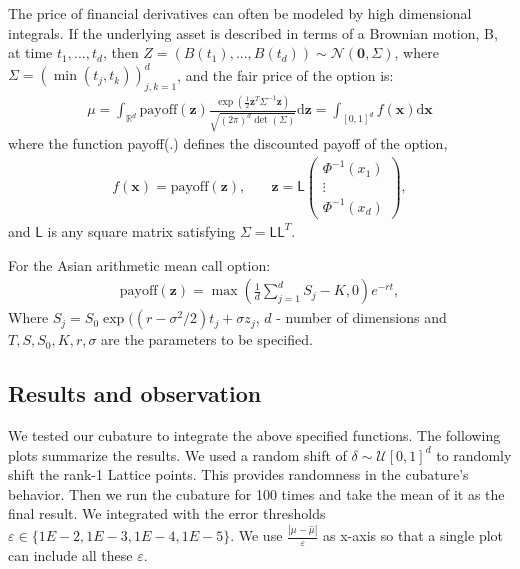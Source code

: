 \documentclass[twocolumn]{svjour3}          %
\newcommand{\bm}[1]{\boldsymbol{#1}}
\newcommand{\mSigma}{\Sigma}
\newcommand{\dif}[1]{\text{d}{#1}}
\newcommand{\reals}{\mathbb{R}}
\newcommand{\vx}{\bm{x}}
\newcommand{\dvx}{\dif{\bm{x}}}
\newcommand{\vz}{\bm{z}}
\newcommand{\dvz}{\dif{\bm{z}}}
\newcommand{\vzero}{\bm{0}}
\newcommand{\mL}{\mathsf{L}}
\newcommand{\calN}{\mathcal{N}}
\newcommand{\hmu}{\widehat{\mu}}
\def\abs#1{\ensuremath{\left \lvert #1 \right \rvert}}
\begin{document}
\begin{enumerate}
The price of financial derivatives can often be modeled by high dimensional integrals. If the underlying asset is described in terms of a Brownian motion, B, at time $t_1,...,t_d$, then $Z = (B(t_1), ..., B(t_d)) \sim \calN(\vzero,\mSigma)$, where $\mSigma = \left(\min(t_j,t_k) \right)_{j,k=1}^d$, and the fair price of the option is:
\begin{align*}
\mu = \int_{\reals^d} \text{payoff}(\vz) \frac{\exp(\frac 12 \vz^T\mSigma^{-1}\vz)}{\sqrt{(2\pi)^d \det(\mSigma)}} \dvz = \int_{[0,1]^d} f(\vx) \dvx
\end{align*}
where the function {payoff(.)} defines the discounted payoff of the option,
\begin{align*}
f(\vx) = \text{payoff}(\vz), & \quad \vz = \mL 
\begin{pmatrix}
\Phi^{-1}(x_1) \\ \vdots \\ \Phi^{-1}(x_d)
\end{pmatrix},
\end{align*}
and $\mL$ is any square matrix satisfying $\mSigma = \mL \mL^T$.

For the Asian arithmetic mean call option:
\begin{multline*}
\text{payoff}(\vz) = \max\left( \frac 1d  \sum_{j=1}^d S_j - K, 0 \right) e^{-r t}, \end{multline*}
Where $S_j = S_0 \exp((r-\sigma^2/2)t_j + \sigma z_j$, 
$d$ - number of dimensions and $T, S, S_0, K, r, \sigma$ are the parameters to be specified.


\end{enumerate}














\subsection{Results and observation}

We tested our cubature to integrate the above specified functions. The following plots summarize the results. We used a random shift of $\delta \sim \mathcal{U}[0,1]^d$ to randomly shift the rank-1 Lattice points. This provides randomness in the cubature's behavior. Then we run the cubature for 100 times and take the mean of it as the final result. We integrated with the error thresholds $\varepsilon \in \{1E-2, 1E-3, 1E-4, 1E-5\}$. We use $\frac{\abs{\mu - \hmu}}{\varepsilon}$ as x-axis so that a single plot can include all these $\varepsilon$.
\end{document}
